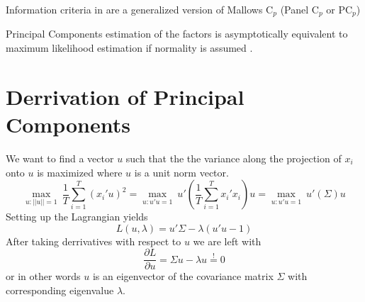 \documentclass[11pt]{article}
\begin{document}
Information criteria in \citet{bai2002determining} are a generalized version of Mallows C$_p$ \citep{mallows1973some} (Panel C$_p$ or PC$_p$)

Principal Components estimation of the factors is asymptotically equivalent to maximum likelihood estimation if normality is assumed \citep{bai2003inferential}.


\appendix
{}

\section{Derrivation of Principal Components}

We want to find a vector $u$ such that the the variance along the projection of $x_i$ onto $u$ is maximized where $u$ is a unit norm vector.
$$\underset{u: ||u|| = 1}{\max} \ \frac{1}{T} \sum_{i=1}^T(x_i'u)^2 = \underset{u: u'u = 1}{\max} \ u' ( \frac{1}{T} \sum_{i=1}^T x_i'x_i )u = \underset{u: u'u = 1}{\max} \ u' (\Sigma)u$$
Setting up the Lagrangian yields
$$ L(u, \lambda) = u' \Sigma - \lambda(u'u-1)$$
After taking derrivatives with respect to $u$ we are left with
$$\frac{\partial L}{\partial u} = \Sigma u -\lambda u \overset{!}{=} 0$$ or in other words $u$ is an eigenvector of the covariance matrix $\Sigma$ with corresponding eigenvalue $\lambda$.




\end{document}
